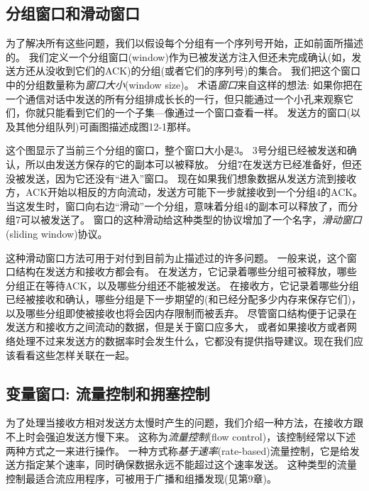 \documentclass{../main.tex}{subfiles}
\begin{document}
\subsection{分组窗口和滑动窗口}
为了解决所有这些问题，我们以假设每个分组有一个序列号开始，正如前面所描述的。
我们定义一个分组窗口(window)作为已被发送方注入但还未完成确认(如，发送方还从没收到它们的ACK)的分组(或者它们的序列号)的集合。
我们把这个窗口中的分组数量称为\emph{窗口大小}(window size)。
术语\emph{窗口}来自这样的想法:
如果你把在一个通信对话中发送的所有分组排成长长的一行，但只能通过一个小孔来观察它们，你就只能看到它们的一个子集---像通过一个窗口查看一样。
发送方的窗口(以及其他分组队列)可画图描述成图12-1那样。

这个图显示了当前三个分组的窗口，整个窗口大小是3。
3号分组已经被发送和确认，所以由发送方保存的它的副本可以被释放。
分组7在发送方已经准备好，但还没被发送，因为它还没有``进入''窗口。
现在如果我们想象数据从发送方流到接收方，ACK开始以相反的方向流动，发送方可能下一步就接收到一个分组4的ACK。
当这发生时，窗口向右边``滑动''一个分组，意味着分组4的副本可以释放了，而分组7可以被发送了。
窗口的这种滑动给这种类型的协议增加了一个名字，\emph{滑动窗口}(sliding window)协议。

这种滑动窗口方法可用于对付到目前为止描述过的许多问题。
一般来说，这个窗口结构在发送方和接收方都会有。
在发送方，它记录着哪些分组可被释放，哪些分组正在等待ACK，以及哪些分组还不能被发送。
在接收方，它记录着哪些分组已经被接收和确认，哪些分组是下一步期望的(和已经分配多少内存来保存它们)，以及哪些分组即使被接收也将会因内存限制而被丢弃。
尽管窗口结构便于记录在发送方和接收方之间流动的数据，但是关于窗口应多大，
    或者如果接收方或者网络处理不过来发送方的数据率时会发生什么，它都没有提供指导建议。现在我们应该看看这些怎样关联在一起。


\subsection{变量窗口: 流量控制和拥塞控制}
为了处理当接收方相对发送方太慢时产生的问题，我们介绍一种方法，在接收方跟不上时会强迫发送方慢下来。
这称为\emph{流量控制}(flow control)，该控制经常以下述两种方式之一来进行操作。
一种方式称\emph{基于速率}(rate-based)流量控制，它是给发送方指定某个速率，同时确保数据永远不能超过这个速率发送。
这种类型的流量控制最适合流应用程序，可被用于广播和组播发现(见第9章)。
\end{document}
